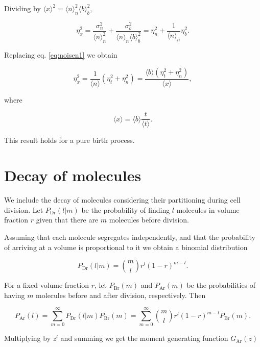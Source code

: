 Dividing by $\langle x\rangle^2=\langle n\rangle_n^2\langle b\rangle_b^2$,

\begin{equation*}
  \eta_x^2=\frac{\sigma_n^2}{\langle n\rangle_n^2} + \frac{\sigma_b^2}{\langle n\rangle_n\langle b\rangle_b^2} = \eta_n^2+\frac{1}{\langle n\rangle_n}\eta_b^2.
\end{equation*}

Replacing eq. \ref{eq:noisen1} we obtain

\begin{equation}
  \label{eq:noisex}
  \eta_x^2=\frac{1}{\langle n\rangle}\left(\eta_t^2+\eta_n^2\right)=\frac{\langle b\rangle\left(\eta_t^2+\eta_n^2\right)}{\langle x\rangle},
\end{equation}

where

\begin{equation}
  \langle x\rangle = \langle b\rangle\frac{t}{\langle t\rangle}.
\end{equation}

This result holds for a pure birth process.

\section{Decay of molecules}

We include the decay of molecules considering their partitioning during cell division. Let $P_\text{Dr}(l|m)$ be the probability of finding $l$ molecules in volume fraction $r$ given that there are $m$ molecules before division.

Assuming that each molecule segregates independently, and that the probability of arriving at a volume is proportional to it we obtain a binomial distribution

\begin{equation*}
  P_\text{Dr}(l|m) = {m\choose l}r^l(1-r)^{m-l}.
\end{equation*}

For a fixed volume fraction $r$, let $P_\text{Br}(m)$ and $P_\text{Ar}(m)$ be the probabilities of having $m$ molecules before and after division, respectively. Then

\begin{equation*}
  P_\text{Ar}(l) = \sum_{m=0}^\infty P_\text{Dr}(l|m)P_\text{Br}(m) = \sum_{m=0}^\infty {m\choose l}r^l(1-r)^{m-l}P_\text{Br}(m).
\end{equation*}

Multiplying by $z^l$ and summing we get the moment generating function $G_\text{Ar}(z)$

